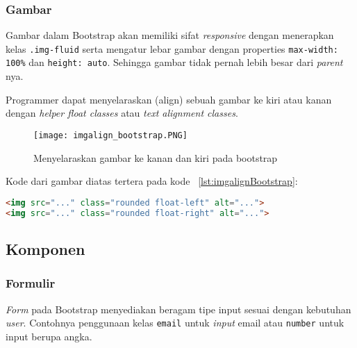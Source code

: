 \subsubsection{Gambar}
Gambar dalam Bootstrap akan memiliki sifat \textit{responsive} dengan menerapkan kelas \texttt{.img-fluid} serta mengatur lebar gambar dengan properties \texttt{max-width: 100\%} dan \texttt{height: auto}. Sehingga gambar tidak pernah lebih besar dari \textit{parent} nya. 

Programmer dapat menyelaraskan (align) sebuah gambar ke kiri atau kanan dengan \textit{helper float classes} atau \textit{text alignment classes}. 
\begin{figure} [H]
	\centering  
	\texttt{[image: imgalign\_bootstrap.PNG]}  
	\caption{Menyelaraskan gambar ke kanan dan kiri pada bootstrap} 
	\label{fig:imageAlignStripedBootstrap}
\end{figure}

\noindent Kode dari gambar diatas tertera pada kode ~\ref{lst:imgalignBootstrap}:
\begin{lstlisting}[style=customhtml, language=HTML,  basicstyle=\ttfamily, frame=single, columns=fullflexible, keepspaces=true, breaklines=true, showstringspaces=false, label={lst:imgalignBootstrap}, caption=Image Align pada bootstrap 4.]
<img src="..." class="rounded float-left" alt="...">
<img src="..." class="rounded float-right" alt="...">
\end{lstlisting}



\subsection{Komponen}
\subsubsection{Formulir}
\textit{Form} pada Bootstrap menyediakan beragam tipe input sesuai dengan kebutuhan \textit{user}. Contohnya penggunaan kelas \texttt{email} untuk \textit{input} email atau \texttt{number} untuk input berupa angka.
